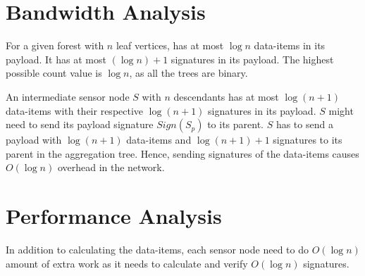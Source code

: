 	
\section{Bandwidth Analysis}
	For a given forest with $n$ leaf vertices, has at most $\log n$ data-items in its payload.
	It has at most $(\log n) +1$ signatures in its payload.
	The highest possible count value is $\log n$, as all the trees are binary. 

	An intermediate sensor node $S$ with $n$ descendants has at most $\log(n+1)$ data-items with their respective $\log(n+1)$ signatures in its payload.
	$S$ might need to send its payload signature $Sign(S_{p})$ to its parent.
	$S$ has to send a payload with $\log(n+1)$ data-items and $\log(n+1) +1$ signatures to its parent in the aggregation tree.
	Hence, sending  signatures of the data-items causes $O(\log n)$ overhead in the network. 

\section{Performance Analysis}
	In addition to calculating the data-items, each sensor node need to do $O(\log n)$ amount of extra work as it needs to calculate and verify $O(\log n)$ signatures. 


